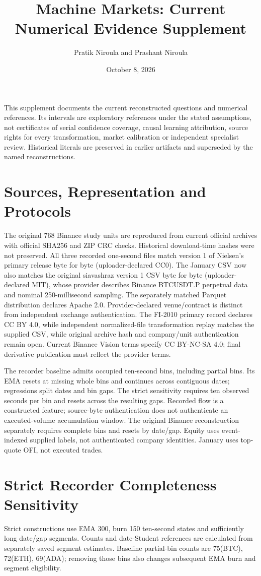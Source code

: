 \documentclass[10pt]{article}
\title{Machine Markets: Current Numerical Evidence Supplement}
\author{Pratik Niroula and Prashant Niroula}\date{October 8, 2026}
\begin{document}
\maketitle
\noindent This supplement documents the current reconstructed questions and numerical references. Its intervals are exploratory references under the stated assumptions, not certificates of serial confidence coverage, causal learning attribution, source rights for every transformation, market calibration or independent specialist review. Historical literals are preserved in earlier artifacts and superseded by the named reconstructions.

\section{Sources, Representation and Protocols}
The original 768 Binance study units are reproduced from current official archives with official SHA256 and ZIP CRC checks. Historical download-time hashes were not preserved. All three recorded one-second files match version 1 of Nielsen's primary release byte for byte (uploader-declared CC0). The January CSV now also matches the original siavashraz version 1 CSV byte for byte (uploader-declared MIT), whose provider describes Binance BTCUSDT.P perpetual data and nominal 250-millisecond sampling. The separately matched Parquet distribution declares Apache 2.0. Provider-declared venue/contract is distinct from independent exchange authentication. The FI-2010 primary record declares CC BY 4.0, while independent normalized-file transformation replay matches the supplied CSV, while original archive hash and company/unit authentication remain open. Current Binance Vision terms specify CC BY-NC-SA 4.0; final derivative publication must reflect the provider terms.

The recorder baseline admits occupied ten-second bins, including partial bins. Its EMA resets at missing whole bins and continues across contiguous dates; regressions split dates and bin gaps. The strict sensitivity requires ten observed seconds per bin and resets across the resulting gaps. Recorded flow is a constructed feature; source-byte authentication does not authenticate an executed-volume accumulation window. The original Binance reconstruction separately requires complete bins and resets by date/gap. Equity uses event-indexed supplied labels, not authenticated company identities. January uses top-quote OFI, not executed trades.

\section{Strict Recorder Completeness Sensitivity}
Strict constructions use EMA 300, burn 150 ten-second states and sufficiently long date/gap segments. Counts and date-Student references are calculated from separately saved segment estimates. Baseline partial-bin counts are 75(BTC), 72(ETH), 69(ADA); removing those bins also changes subsequent EMA burn and segment eligibility.
\end{document}
